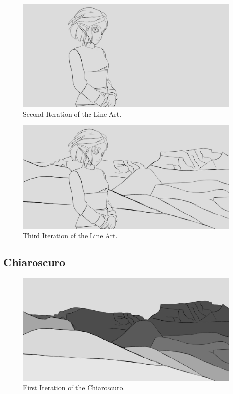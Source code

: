 \documentclass{cup-pan}
\begin{document}
        \begin{figure}[H]
            \includegraphics[width=\textwidth]{Fanart3/1_LineArt/II_Iteracion.png}
            \caption{Second Iteration of the Line Art.}
        \end{figure}

        \begin{figure}[H]
            \includegraphics[width=\textwidth]{Fanart3/1_LineArt/III_Iteracion.png}
            \caption{Third Iteration of the Line Art.}
        \end{figure}

    \subsection{Chiaroscuro}

        \begin{figure}[H]
            \includegraphics[width=\textwidth]{Fanart3/2_Claroscuro/I_Iteracion.png}
            \caption{First Iteration of the Chiaroscuro.}
        \end{figure}
\end{document}
